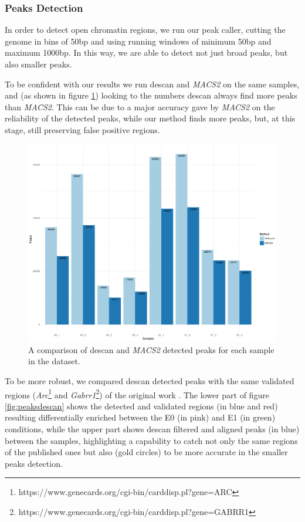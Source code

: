 \subsubsection{Peaks Detection}

In order to detect open chromatin regions, we run our peak caller, cutting the genome in bins of 50bp and using running windows of minimum 50bp and maximum 1000bp.
In this way, we are able to detect not just broad peaks, but also smaller peaks.

To be confident with our results we run \gls{descan} and \textit{MACS2}  \cite{Zhang2008} on the same samples, and (as shown in figure \ref{fig:des2m2peaks}) looking to the numbers \gls{descan} always find more peaks than \textit{MACS2}.
This can be due to a major accuracy gave by \textit{MACS2} on the reliability of the detected peaks, while our method finds more peaks, but, at this stage, still preserving false positive regions.

\begin{figure}[H]
\includegraphics[width=\textwidth, keepaspectratio]{img/descan2/d2m2_peaks_number.png}
\caption[The \gls{descan} and \textit{MACS2} peaks detection]{A comparison of \gls{descan} and \textit{MACS2} detected peaks for each sample in the dataset.}
\label{fig:des2m2peaks}
\centering
\end{figure}

To be more robust, we compared \gls{descan} detected peaks with the same validated regions (\textit{Arc}\footnote{https://www.genecards.org/cgi-bin/carddisp.pl?gene=ARC} and \textit{Gabrr1}\footnote{https://www.genecards.org/cgi-bin/carddisp.pl?gene=GABRR1}) of the original work \cite{Su2017}.
The lower part of figure \ref{fig:peaksdescan} shows the detected and validated regions (in blue and red) resulting differentially enriched between the E0 (in pink) and E1 (in green) conditions, while the upper part shows \gls{descan} filtered and aligned peaks (in blue) between the samples, highlighting a capability to catch not only the same regions of the published ones but also (gold circles) to be more accurate in the smaller peaks detection.

